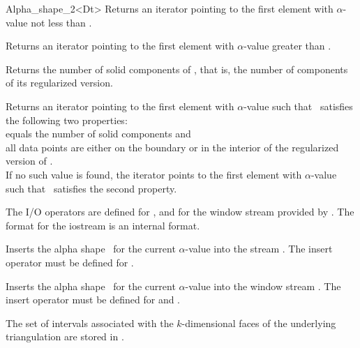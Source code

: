 \begin{ccRefClass} {Alpha_shape_2<Dt>}
{Returns an iterator pointing to the first element with
$\alpha$-value not less than .}

{Returns an iterator pointing to the first element with $\alpha$-value
greater than .}


{Returns the number of solid components of \ccVar, that is, the number of
components of its 
regularized version.}

{Returns an iterator pointing to the first element with $\alpha$-value
such that \ccVar\ satisfies the following two properties:\\
 equals the number of solid components and \\
all data points are either on the boundary or in the interior of the regularized version of \ccVar.\\
If no such value is found, the iterator points to the first element with 
$\alpha$-value such that \ccVar\ satisfies the second property.}


The I/O operators are defined for , and for
the window stream provided by \cgal. The format for the iostream
is an internal format. 


{Inserts the alpha shape \ccVar\ for the current $\alpha$-value into the stream .
\ccPrecond The insert operator must be defined for .}



{Inserts the alpha shape \ccVar\ for the current $\alpha$-value into the window stream .
\ccPrecond The insert operator must be defined for  and .}

\ccImplementation
The set of intervals associated with the
$k$-dimensional faces of the underlying triangulation are
stored in .


\end{ccRefClass}
